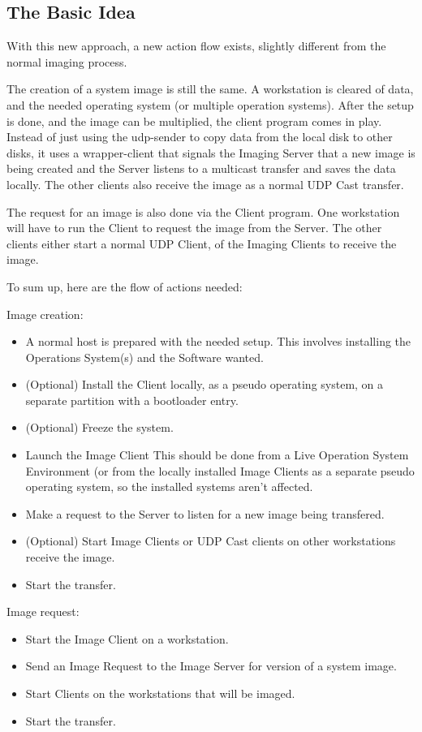 \subsection{The Basic Idea}


With this new approach, a new action flow exists, slightly different from
the normal imaging process.


The creation of a system image is still the same. A workstation is cleared
of data, and the needed operating system (or multiple operation systems).
After the setup is done, and the image can be multiplied, the client
program comes in play. Instead of just using the udp-sender to copy data
from the local disk to other disks, it uses a wrapper-client that signals
the Imaging Server that a new image is being created and the Server listens
to a multicast transfer and saves the data locally. The other clients also
receive the image as a normal UDP Cast transfer.


The request for an image is also done via the Client program. One
workstation will have to run the Client to request the image from the
Server. The other clients either start a normal UDP Client, of the Imaging
Clients to receive the image.


To sum up, here are the flow of actions needed:


Image creation:
\begin{itemize}
\item A normal host is prepared with the needed setup. This involves
installing the Operations System(s) and the Software wanted.
\item (Optional) Install the Client locally, as a pseudo operating system,
on a separate partition with a bootloader entry.
\item (Optional) Freeze the system.
\item Launch the Image Client This should be done from a Live Operation
System Environment (or from the locally installed Image Clients as a
separate pseudo operating system, so the installed systems aren't affected.
\item Make a request to the Server to listen for a new image being
transfered.
\item (Optional) Start Image Clients or UDP Cast clients on other
workstations receive the image.
\item Start the transfer.

\end{itemize}
Image request:
\begin{itemize}
\item Start the Image Client on a workstation.
\item Send an Image Request to the Image Server for version of a system
image.
\item Start Clients on the workstations that will be imaged.
\item Start the transfer.
\end{itemize}

